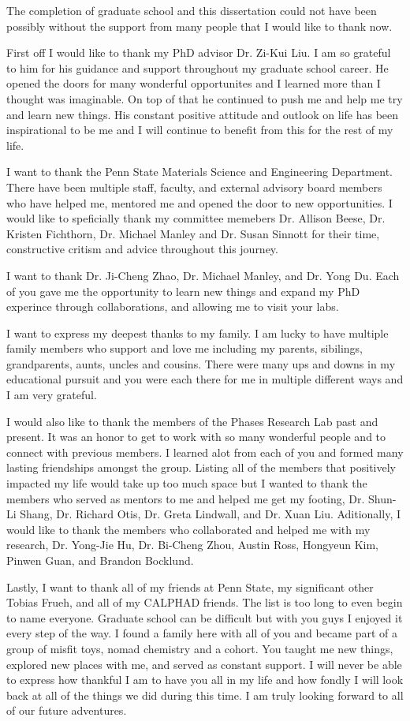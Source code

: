 The completion of graduate school and this dissertation could not have been possibly without the support from many people that I would like to thank now.

First off I would like to thank my PhD advisor Dr. Zi-Kui Liu. I am so grateful to him for his guidance and support throughout my graduate school career. He opened the doors for many wonderful opportunites and I learned more than I thought was imaginable. On top of that he continued to push me and help me try and learn new things. His constant positive attitude and outlook on life has been inspirational to be me and I will continue to benefit from this for the rest of my life.

I want to thank the Penn State Materials Science and Engineering Department. There have been multiple staff, faculty, and external advisory board members who have helped me, mentored me and opened the door to new opportunities. I would like to speficially thank my committee memebers Dr. Allison Beese, Dr. Kristen Fichthorn, Dr. Michael Manley and Dr. Susan Sinnott for their time, constructive critism and advice throughout this journey.

I want to thank Dr. Ji-Cheng Zhao, Dr. Michael Manley, and Dr. Yong Du. Each of you gave me the opportunity to learn new things and expand my PhD experince through collaborations, and allowing me to visit your labs. 

I want to express my deepest thanks to my family. I am lucky to have multiple family members who support and love me including my parents, sibilings, grandparents, aunts, uncles and cousins. There were many ups and downs in my educational pursuit and you were each there for me in multiple different ways and I am very grateful.

I would also like to thank the members of the Phases Research Lab past and present. It was an honor to get to work with so many wonderful people and to connect with previous members. I learned alot from each of you and formed many lasting friendships amongst the group. Listing all of the members that positively impacted my life would take up too much space but I wanted to thank the members who served as mentors to me and helped me get my footing, Dr. Shun-Li Shang, Dr. Richard Otis, Dr. Greta Lindwall, and Dr. Xuan Liu. Aditionally, I would like to thank the members who collaborated and helped me with my research, Dr. Yong-Jie Hu, Dr. Bi-Cheng Zhou, Austin Ross, Hongyeun Kim, Pinwen Guan, and Brandon Bocklund. 

Lastly, I want to thank all of my friends at Penn State, my significant other Tobias Frueh, and all of my CALPHAD friends. The list is too long to even begin to name everyone. Graduate school can be difficult but with you guys I enjoyed it every step of the way. I found a family here with all of you and became part of a group of misfit toys, nomad chemistry and a cohort. You taught me new things, explored new places with me, and served as constant support. I will never be able to express how thankful I am to have you all in my life and how fondly I will look back at all of the things we did during this time. I am truly looking forward to all of our future adventures.